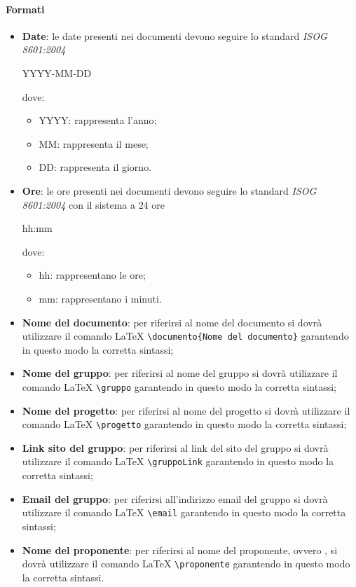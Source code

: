 \paragraph{Formati}
\begin{itemize}
   \item \textbf{Date}: le date presenti nei documenti devono seguire lo standard \textit{ISOG 
   8601:2004}
   \begin{center}
     YYYY-MM-DD
   \end{center}
   dove:
   \begin{itemize}
     \item YYYY: rappresenta l'anno;
     \item MM: rappresenta il mese;
     \item DD: rappresenta il giorno.
   \end{itemize}
   \item \textbf{Ore}: le ore presenti nei documenti devono seguire lo standard \textit{ISOG 8601:2004} 
   con il sistema a 24 ore
   \begin{center}
     hh:mm
   \end{center}
   dove:
   \begin{itemize}
     \item hh: rappresentano le ore;
     \item mm: rappresentano i minuti.
   \end{itemize}
   \item \textbf{Nome del documento}: per riferirsi al nome del documento si 
   dovrà utilizzare il comando \LaTeX{}   \verb|\documento{Nome del documento}| 
   garantendo in questo modo la corretta sintassi;
   \item \textbf{Nome del gruppo}: per riferirsi al nome del gruppo si dovrà 
   utilizzare il comando \LaTeX{} \verb|\gruppo| garantendo in questo modo la corretta sintassi;
   \item \textbf{Nome del progetto}: per riferirsi al nome del progetto si dovrà 
   utilizzare il comando \LaTeX{} \verb|\progetto| garantendo in questo modo la corretta sintassi;
   \item \textbf{Link sito del gruppo}: per riferirsi al link del sito del gruppo si dovrà 
   utilizzare il comando \LaTeX{} \verb|\gruppoLink| garantendo in questo modo la corretta sintassi;
   \item \textbf{Email del gruppo}: per riferirsi all'indirizzo email del gruppo si dovrà 
   utilizzare il comando \LaTeX{} \verb|\email| garantendo in questo modo la corretta sintassi;
   \item \textbf{Nome del proponente}: per riferirsi al nome del proponente, ovvero \proponente, si dovrà 
   utilizzare il comando \LaTeX{}  \verb|\proponente| garantendo in questo modo la corretta 
   sintassi.
      \end{itemize}

